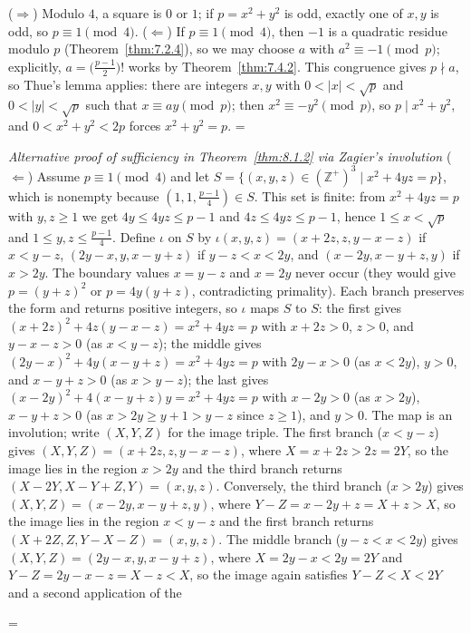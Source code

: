 \documentclass[11pt]{article}
\makeatletter
\theoremstyle{ntstyle}
\let\nt@closedisplay\]
\def\nt@guardedclose{\@ifnextchar\par{\nt@closeafterpar}{\@ifnextchar\end{\postdisplaypenalty\@M\nt@closedisplay}{\nt@closedisplay}}}
\def\nt@closeafterpar\par{\@ifnextchar\par{\nt@closeafterpar}{\@ifnextchar\end{\postdisplaypenalty\@M\nt@closedisplay\par}{\nt@closedisplay\par}}}
\renewenvironment{proof}[1][\proofname]{\par
  \pushQED{\qed}\normalfont\topsep\medskipamount\edef\nt@afterproof{\@endparpenalty=\the\@endparpenalty\relax}\@beginparpenalty\@M\@endparpenalty\@M\let\]\nt@guardedclose\trivlist\item[]\textit{#1\@addpunct{.}} \ignorespaces}{\ifvmode\addpenalty\@M\fi\popQED\nt@afterproof\endtrivlist\@endpefalse}
\newenvironment{altproof}[1][\proofname]{\begin{proof}[#1]}{\end{proof}}
\makeatother
\begin{document}
\begin{proof} ($\Rightarrow$) Modulo $4$, a square is $0$
	or $1$; if $p = x^2 + y^2$ is odd, exactly one of $x, y$ is odd, so
	$p \equiv 1 \pmod{4}$. ($\Leftarrow$) If $p \equiv 1 \pmod{4}$, then
	$-1$ is a quadratic residue modulo $p$ (Theorem~\ref{thm:7.2.4}), so we may choose $a$ with $a^2
		\equiv -1 \pmod{p}$; explicitly, $a=\big(\tfrac{p-1}{2}\big)!$ works by
	Theorem~\ref{thm:7.4.2}. This congruence gives $p\nmid a$, so Thue's
	lemma applies: there are integers $x, y$ with $0 < |x| < \sqrt{p}$ and $0 < |y| < \sqrt{p}$ such
	that $x \equiv a y \pmod{p}$; then $x^2 \equiv -y^2
		\pmod{p}$, so $p \mid x^2 + y^2$, and $0 < x^2 + y^2 < 2p$ forces $x^2
		+ y^2 = p$.
\end{proof}
\begin{altproof}[Alternative proof of sufficiency in Theorem~\ref{thm:8.1.2} via Zagier's
involution] ($\Leftarrow$) Assume $p \equiv 1
		\pmod{4}$ and let $S = \{(x, y, z) \in (\mathbb{Z}^+)^3 \mid x^2 + 4yz =
		p\}$, which is nonempty because $(1, 1, \tfrac{p-1}{4}) \in S$. This set is finite:
	from $x^2+4yz=p$ with $y,z\ge1$ we get $4y\le 4yz\le p-1$ and
	$4z\le 4yz\le p-1$, hence $1\le x<\sqrt{p}$ and $1\le y,z\le\tfrac{p-1}{4}$. Define
	$\iota$ on $S$
	by $\iota(x, y, z) = (x + 2z, z, y - x - z)$ if $x < y - z$, $(2y -
		x, y, x - y + z)$ if $y - z < x < 2y$, and $(x - 2y, x - y + z, y)$ if $x
		> 2y$. The boundary values $x = y - z$ and $x = 2y$ never occur (they
	would give $p = (y+z)^2$ or $p = 4y(y+z)$, contradicting primality).
	Each branch preserves the form and returns positive integers, so
	$\iota$ maps $S$ to $S$: the first gives
	$(x+2z)^2+4z(y-x-z)=x^2+4yz=p$ with $x+2z>0$, $z>0$, and $y-x-z>0$
	(as $x<y-z$); the middle gives $(2y-x)^2+4y(x-y+z)=x^2+4yz=p$ with
	$2y-x>0$ (as $x<2y$), $y>0$, and $x-y+z>0$ (as $x>y-z$); the last
	gives $(x-2y)^2+4(x-y+z)y=x^2+4yz=p$ with $x-2y>0$ (as $x>2y$),
	$x-y+z>0$ (as $x>2y\ge y+1>y-z$ since $z\ge1$), and $y>0$.
		The map is an involution; write $(X,Y,Z)$ for the image triple.
		The first branch ($x<y-z$) gives $(X,Y,Z)=(x+2z,z,y-x-z)$, where $X=x+2z>2z=2Y$, so the image
		lies in the region $x>2y$ and the third branch returns $(X-2Y,X-Y+Z,Y)=(x,y,z)$.
		Conversely, the third branch ($x>2y$) gives $(X,Y,Z)=(x-2y,x-y+z,y)$, where $Y-Z=x-2y+z=X+z>X$,
		so the image lies in the region $x<y-z$ and the first branch returns $(X+2Z,Z,Y-X-Z)=(x,y,z)$.
		The middle branch ($y-z<x<2y$) gives $(X,Y,Z)=(2y-x,y,x-y+z)$, where $X=2y-x<2y=2Y$ and
		$Y-Z=2y-x-z=X-z<X$, so the image again satisfies $Y-Z<X<2Y$ and a second application of the

\end{altproof}
\end{document}
